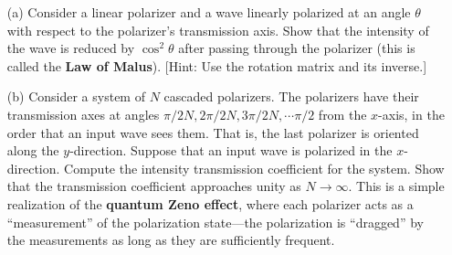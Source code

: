 \documentclass[11pt]{hmcpset}
\begin{document}
\problemlist{}


%


\begin{problem}
	\begin{enumerate}
		\item[(a)] Consider a linear polarizer and a wave linearly polarized at an angle $\theta$ with respect to the polarizer's transmission axis. Show that the intensity of the wave is reduced by $\cos^2 \theta$ after passing through the polarizer (this is called the \textbf{Law of Malus}). [Hint: Use the rotation matrix and its inverse.]
		\item[(b)] Consider a system of $N$ cascaded polarizers. The polarizers have their transmission axes at angles $\pi/2N, 2\pi/2N, 3\pi/2N, \cdots \pi/2$ from the $x$-axis, in the order that an input wave sees them. That is, the last polarizer is oriented along the $y$-direction. Suppose that an input wave is polarized in the $x$-direction. Compute the intensity transmission coefficient for the system. Show that the transmission coefficient approaches unity as $N \rightarrow \infty$. This is a simple realization of the \textbf{quantum Zeno effect}, where each polarizer acts as a ``measurement'' of the polarization state—the polarization is ``dragged'' by the measurements as long as they are sufficiently frequent.
	\end{enumerate}
\end{problem}

\begin{solution}
	\vfill
\end{solution}
\pagebreak
\end{document}
